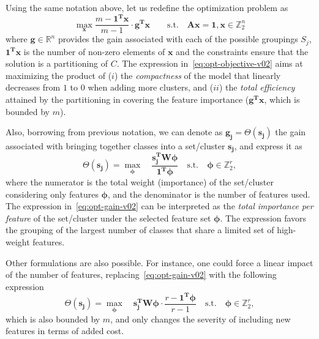 Using the same notation above, let us redefine the optimization problem as
\begin{equation}
\max_{\pmb{x}} \frac{m-\pmb{1^Tx}}{m-1}\cdot\pmb{g^Tx} \qquad \text{s.t.} \quad \pmb{Ax}=\pmb{1}, \pmb{x} \in \mathbb{Z}_2^n
\label{eq:opt-objective-v02}
\end{equation}
where $\pmb{g} \in \mathbb{R}^n$ provides the gain associated with each of the possible groupings $S_j$, $\pmb{1^Tx}$ is the number of non-zero elements of $\pmb{x}$ and the constraints ensure that the solution is a partitioning of $C$. The expression in~\eqref{eq:opt-objective-v02} aims at maximizing the product of ($i$) the \textit{compactness} of the model that linearly decreases from $1$ to $0$ when adding more clusters, and ($ii$) the \textit{total efficiency} attained by the partitioning in covering the feature importance (\ie $\pmb{g^Tx}$, which is bounded by $m$).

Also, borrowing from previous notation, we can denote as $\pmb{g_j}=\Theta(\pmb{s_j})$ the gain associated with bringing together classes into a set/cluster $\pmb{s_j}$, and express it as
\begin{equation}
    \Theta(\pmb{s_j}) = \max_{\pmb{\phi}} \quad \frac{\pmb{s_j^TW\phi}}{\pmb{1^T\phi}} \quad \text{s.t.} \quad \pmb{\phi} \in \mathbb{Z}_2^r,
    \label{eq:opt-gain-v02}
\end{equation}
where the numerator is the total weight (importance) of the set/cluster considering only features $\pmb{\phi}$, and the denominator is the number of features used.
%
The expression in~\eqref{eq:opt-gain-v02} can be interpreted as the \textit{total importance per feature} of the set/cluster under the selected feature set $\pmb{\phi}$. The expression favors the grouping of the largest number of classes that share a limited set of high-weight features.

Other formulations are also possible. For instance, one could force a linear impact of the number of features, replacing~\eqref{eq:opt-gain-v02} with the following expression
\begin{equation}
    \Theta(\pmb{s_j}) = \max_{\pmb{\phi}} \quad \pmb{s_j^TW\phi} \cdot \frac{r-\pmb{1^T\phi}}{r-1} \quad \text{s.t.} \quad \pmb{\phi} \in \mathbb{Z}_2^r,
    \label{eq:opt-gain-v03}
\end{equation}
which is also bounded by $m$, and only changes the severity of including new features in terms of added cost.


